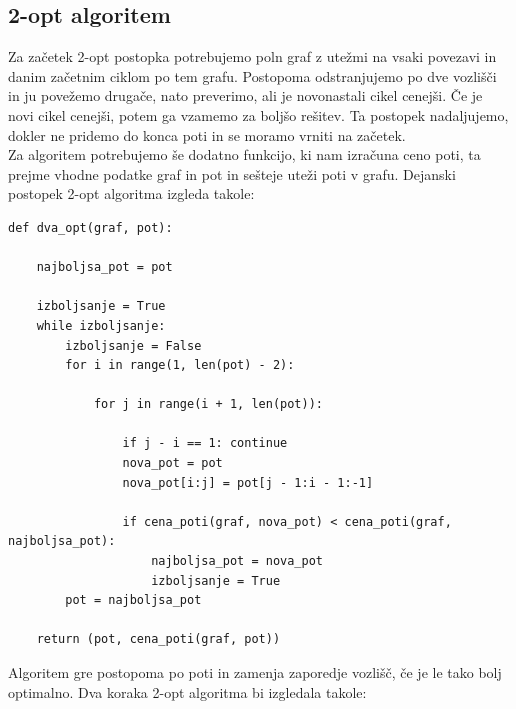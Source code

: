 \documentclass[12pt, a4paper]{article}
\begin{document}
\subsection[2-opt algoritem]{2-opt algoritem}

Za začetek 2-opt postopka potrebujemo poln graf z utežmi na vsaki povezavi in danim začetnim ciklom po tem grafu. Postopoma odstranjujemo po dve vozlišči in ju povežemo drugače, nato preverimo, ali je novonastali cikel cenejši. Če je novi cikel cenejši, potem ga vzamemo za boljšo rešitev. Ta postopek nadaljujemo, dokler ne pridemo do konca poti in se moramo vrniti na začetek. \\

Za algoritem potrebujemo še dodatno funkcijo, ki nam izračuna ceno poti, ta prejme vhodne podatke graf in pot in sešteje uteži poti v grafu. Dejanski postopek 2-opt algoritma izgleda takole:
\begin{verbatim}
def dva_opt(graf, pot):

    najboljsa_pot = pot

    izboljsanje = True
    while izboljsanje:
        izboljsanje = False
        for i in range(1, len(pot) - 2):

            for j in range(i + 1, len(pot)):

                if j - i == 1: continue
                nova_pot = pot
                nova_pot[i:j] = pot[j - 1:i - 1:-1]

                if cena_poti(graf, nova_pot) < cena_poti(graf, najboljsa_pot):
                    najboljsa_pot = nova_pot
                    izboljsanje = True
        pot = najboljsa_pot

    return (pot, cena_poti(graf, pot))

\end{verbatim}

Algoritem gre postopoma po poti in zamenja zaporedje vozlišč, če je le tako bolj optimalno. Dva koraka 2-opt algoritma bi izgledala takole:\\
\end{document}
